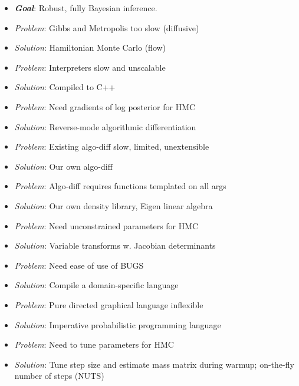 \documentclass[10pt]{report}
\begin{document}
%
\begin{itemize}
\item {\slshape\bfseries Goal}: Robust, fully Bayesian inference.
\end{itemize}
%
\vspace*{2pt}
\begin{itemize}
\item {\slshape Problem}: Gibbs and Metropolis too slow (diffusive)
\item {\slshape Solution}: Hamiltonian Monte Carlo (flow)
%
\vspace*{8pt}
\item {\slshape Problem}:  Interpreters slow and unscalable
\item {\slshape Solution}: Compiled to C++
%
\vspace*{8pt}
\item {\slshape Problem}:  Need gradients of log posterior for HMC
\item {\slshape Solution}: Reverse-mode algorithmic differentiation
\end{itemize}


%
\begin{itemize}
\item {\slshape Problem}:  Existing algo-diff slow, limited, unextensible
\item {\slshape Solution}: Our own algo-diff
%
\vspace*{8pt}
\item {\slshape Problem}:  Algo-diff requires functions templated on
  all args
\item {\slshape Solution}: Our own density library, Eigen linear
 algebra
%
\vspace*{8pt}
\item {\slshape Problem}:  Need unconstrained parameters for HMC
\item {\slshape Solution}: Variable transforms w. Jacobian determinants
%
\end{itemize}


%
\begin{itemize}
\item {\slshape Problem}:  Need ease of use of BUGS
\item {\slshape Solution}: Compile a domain-specific language
%
\vspace*{8pt}
\item {\slshape Problem}:  Pure directed graphical language inflexible
\item {\slshape Solution}: Imperative probabilistic programming
  language
\vspace*{8pt}
\item {\slshape Problem}:  Need to tune parameters for HMC
\item {\slshape Solution}: Tune step size and estimate mass matrix
  during warmup;  on-the-fly number of steps (NUTS)
%
\end{itemize}
\end{document}
